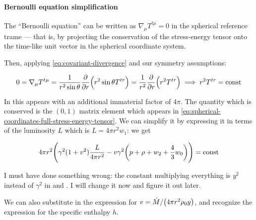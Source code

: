 \documentclass[main.tex]{subfiles}
\begin{document}
\paragraph{Bernoulli equation simplification}

The ``Bernoulli equation'' can be written as \(\nabla_\mu T^{t\mu} = 0\) in the spherical reference trame --- that is, by projecting the conservation of the stress-energy tensor onto the time-like unit vector in the spherical coordinate system.

%

Then, applying \eqref{eq:covariant-divergence} and our symmetry assumptions:

\begin{equation}
  0=\nabla_\mu T^{t \mu}
  = \frac{1}{r^2 \sin \theta} \pdv{}{r} \qty(r^2 \sin\theta T^{tr})
  = \frac{1}{r^2} \pdv{}{r} \qty(r^2 T^{tr})
  \implies
  r^2 T^{tr} = \const
\end{equation}

In \cite[before eq. 18c]{ThorneFLammmangZytkow:1981feb} this appears with an additional immaterial factor of \(4 \pi\). The quantity which is conserved is the $(0,1)$ matrix element which appears in \eqref{eq:spherical-coordinates-full-stress-energy-tensor}. We can simplify it by expressing it in terms of the luminosity \(L\) which is \(L = 4 \pi r^2 w_1\): we get

\begin{equation}
  4 \pi r^2 \qty(\gamma^2 (1+ v^2) \frac{L}{4 \pi r^2} - v \gamma^2 \qty(p + \rho + w_2 + \frac{4}{3} w_0)) = \const
\end{equation}

\begin{greenbox}
    I must have done something wrong: the constant multiplying everything is \(y^2\) instead of \(\gamma^2\) in \cite[]{ThorneFLammmangZytkow:1981feb} and \cite[]{NobiliTurollaZampieri:1991dec}.
    I will change it now and figure it out later.
\end{greenbox}

We can also substitute in the expression for \(v = \dot{M} / \qty(4 \pi r^2 \rho_0 y) \), and recognize the expression for the specific enthalpy \(h\).
\end{document}
